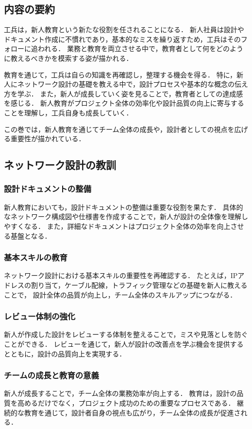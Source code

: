 \documentclass[titlepage,a4paper]{jsarticle}
\begin{document}
\subsection{内容の要約}
工兵は，新人教育という新たな役割を任されることになる．
新人社員は設計やドキュメント作成に不慣れであり，基本的なミスを繰り返すため，工兵はそのフォローに追われる．
業務と教育を両立させる中で，教育者として何をどのように教えるべきかを模索する姿が描かれる．

教育を通じて，工兵は自らの知識を再確認し，整理する機会を得る．
特に，新人にネットワーク設計の基礎を教える中で，設計プロセスや基本的な概念の伝え方を学ぶ．
また，新人が成長していく姿を見ることで，教育者としての達成感を感じる．
新人教育がプロジェクト全体の効率化や設計品質の向上に寄与することを理解し，工兵自身も成長していく．

この巻では，新人教育を通じてチーム全体の成長や，設計者としての視点を広げる重要性が描かれている．

\subsection{ネットワーク設計の教訓}
\subsubsection{設計ドキュメントの整備}
新人教育においても，設計ドキュメントの整備は重要な役割を果たす．
具体的なネットワーク構成図や仕様書を作成することで，新人が設計の全体像を理解しやすくなる．
また，詳細なドキュメントはプロジェクト全体の効率を向上させる基盤となる．

\subsubsection{基本スキルの教育}
ネットワーク設計における基本スキルの重要性を再確認する．
たとえば，IPアドレスの割り当て，ケーブル配線，トラフィック管理などの基礎を新人に教えることで，
設計全体の品質が向上し，チーム全体のスキルアップにつながる．

\subsubsection{レビュー体制の強化}
新人が作成した設計をレビューする体制を整えることで，ミスや見落としを防ぐことができる．
レビューを通じて，新人が設計の改善点を学ぶ機会を提供するとともに，設計の品質向上を実現する．

\subsubsection{チームの成長と教育の意義}
新人が成長することで，チーム全体の業務効率が向上する．
教育は，設計の品質を高めるだけでなく，プロジェクト成功のための重要なプロセスである．
継続的な教育を通じて，設計者自身の視点も広がり，チーム全体の成長が促進される．
\newpage
\end{document}
